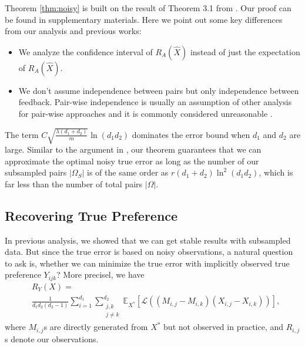 \documentclass[conference]{IEEEtran}
\numberwithin{equation}{section}
\newtheorem{sampling strategy}{Sampling Strategy}
\begin{document}
Theorem \ref{thm:noisy} is built on the result of Theorem 3.1 from \cite{cr}. Our proof can be found in supplementary materials. Here we point out some key differences from our analysis and previous works:
\begin{itemize}
    \item We analyze the confidence interval of $R_A(\hat{X})$ instead of just the expectation of $R_A(\hat{X})$.
    \item We don't assume independence between pairs but only independence between feedback. Pair-wise independence is usually an assumption of other analysis for pair-wise approaches and it is commonly considered unreasonable \cite{listwise}. 
\end{itemize}
The term $C \sqrt{\frac{\lambda (d_1 + d_2)}{m}} \ln(d_1 d_2)$ dominates the error bound when $d_1$ and $d_2$ are large.
Similar to the argument in \cite{cr}, our theorem guarantees that we can approximate the optimal noisy true error as long as the number of our subsampled pairs $|\Omega_S|$ is of the same order as $r(d_1 + d_2)\ln^2(d_1 d_2)$, which is far less than the number of total pairs $|\Omega|$.


\subsection{Recovering True Preference}

In previous analysis, we showed that we can get stable results with subsampled data. But since the true error is based on noisy observations, a natural question to ask is, whether we can  minimize the true error with implicitly observed true preference $Y_{ijk}$? More precisel, we have 
\begin{equation}
    \begin{aligned}
    & R_Y(X) = \\
    & \frac{1}{d_1 d_2(d_2-1)} \sum_{i=1}^{d_1}\sum_{\substack{j,k\\ j \neq k} }^{d_2} \mathbb{E}_{X^*} [ \mathcal{L}( (M_{i,j} - M_{i,k})(X_{i,j} - X_{i,k}) ) ],   \nonumber
    \end{aligned}
\end{equation} 
where $M_{i,j}$s are directly generated from $X^*$ but not observed in practice, and  $R_{i,j}$s denote our observations.
\end{document}

